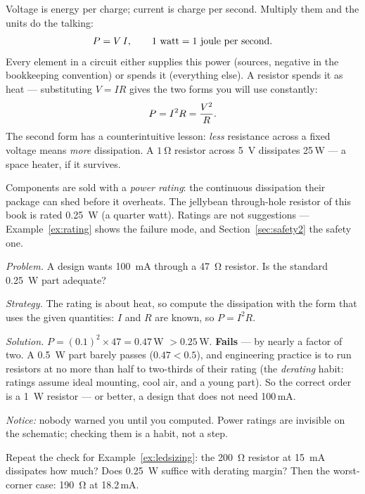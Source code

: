 Voltage is energy per charge; current is charge per second. Multiply them
and the units do the talking:
\[
  P = V\,I, \qquad \text{1 watt} = \text{1 joule per second}.
  \index{power|textbf}\index{watt}
\]
Every element in a circuit either supplies this power (sources, negative in
the bookkeeping convention) or spends it (everything else). A resistor spends
it as heat — substituting $V=IR$ gives the two forms you will use constantly:
\[
  P = I^2 R = \frac{V^2}{R}. \index{power!dissipation}
\]
The second form has a counterintuitive lesson: \emph{less} resistance across a
fixed voltage means \emph{more} dissipation. A $\qty{1}{\ohm}$ resistor across
\qty{5}{\volt} dissipates 25\,W — a space heater, if it survives.

Components are sold with a \emph{power rating}: the
continuous dissipation their package can shed before it overheats. The
jellybean through-hole resistor of this book is rated
\qty{0.25}{\watt} (a quarter watt). Ratings are not suggestions —
Example~\ref{ex:rating} shows the failure mode, and Section~\ref{sec:safety2}
the safety one.

\begin{example}
\label{ex:rating}
\emph{Problem.} A design wants \qty{100}{\milli\ampere} through a
\qty{47}{\ohm} resistor. Is the standard \qty{0.25}{\watt} part
adequate?\par
\emph{Strategy.} The rating is about heat, so compute the dissipation with the
form that uses the given quantities: $I$ and $R$ are known, so $P=I^2R$.\par
\emph{Solution.} $P = (0.1)^2 \times 47 = 0.47$\,W $> 0.25$\,W. \textbf{Fails}
— by nearly a factor of two. A \qty{0.5}{\watt} part barely passes
($0.47 < 0.5$), and engineering practice is to run resistors at no more than
half to two-thirds of their rating (the \emph{derating}
habit: ratings assume ideal mounting, cool air, and a young part). So the
correct order is a \qty{1}{\watt} resistor — or better, a design that does not
need 100\,mA.\par
\emph{Notice:} nobody warned you until you computed. Power ratings are
invisible on the schematic; checking them is a habit, not a step.
\end{example}

\begin{exercise}[medium]
Repeat the check for Example~\ref{ex:ledsizing}: the \qty{200}{\ohm} resistor
at \qty{15}{\milli\ampere} dissipates how much? Does \qty{0.25}{\watt} suffice
with derating margin? Then the worst-corner case: \qty{190}{\ohm} at
18.2\,mA.
\end{exercise}

